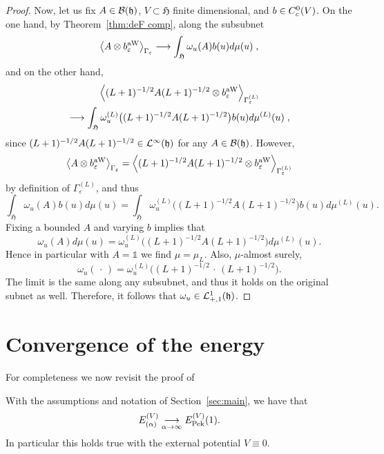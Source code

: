 \documentclass[AHL,Unicode,longabstracts,published]{cedram}
\DeclareMathOperator{\Pek}{Pek}
\DeclareMathOperator{\aww}{aW}
\newcommand{\cL}{\mathcal{L}}
\newcommand{\gH}{\mathfrak{H}}
\newcommand{\gh}{\mathfrak{h}}
\newcommand{\cB}{\mathcal{B}}
\newcommand{\1}{\mathds{1}}
\let\oldin\in
\renewcommand{\in}{\mathchoice{\oldin}{\oldin}{\,\oldin\,}{\,\oldin\,}}
\renewcommand*{\to}{\mathchoice{\longrightarrow}{\rightarrow}{\rightarrow}{\rightarrow}}
\let\originalleft\left
\let\originalright\right
\renewcommand{\left}{\mathopen{}\mathclose\bgroup\originalleft}
\renewcommand{\right}{\aftergroup\egroup\originalright}
\begin{document}
\begin{proof}
Now, let us fix $A\in \cB(\gh)$, $V\subset  \gH$ finite dimensional, and $b\in C^0_c(V)$. On the one hand, by Theorem~\ref{thm:deF comp}, along the subsubnet
\begin{equation*}
\left\langle A\otimes b^{\aww}_{\varepsilon} \right\rangle_{\Gamma_\varepsilon}\to \int_{  \gH}^{}\omega_u(A)b(u) d\mu(u)\;,
\end{equation*}
and on the other hand,
\begin{multline*}
\left\langle (L+1)^{-1/2}A(L+1)^{-1/2}\otimes b^{\aww}_{\varepsilon} \right\rangle_{\Gamma^{(L)}_\varepsilon}\\
\to \int_{\gH}^{}\omega_u^{(L)}\bigl((L+1)^{-1/2}A(L+1)^{-1/2}\bigr)b(u) d\mu^{(L)}(u)\;,
\end{multline*}
since $(L+1)^{-1/2}A(L+1)^{-1/2}\in \cL^{\infty}(\gh)$ for any $A\in
\cB(\gh)$. However,
\begin{equation*}
\left\langle A\otimes b^{\aww}_{\varepsilon} \right\rangle_{\Gamma_\varepsilon}=\left\langle (L+1)^{-1/2}A(L+1)^{-1/2}\otimes b^{\aww}_{\varepsilon} \right\rangle_{\Gamma^{(L)}_\varepsilon}
\end{equation*}
by definition of $\Gamma_{\varepsilon}^{(L)}$, and thus
\begin{equation*}
\int_{  \gH}^{}\omega_u(A)b(u) d\mu(u)=\int_{  \gH}^{}\omega_u^{(L)}\bigl((L+1)^{-1/2}A(L+1)^{-1/2}\bigr)b(u) d\mu^{(L)}(u).
\end{equation*}
Fixing a bounded $A$ and varying $b$ implies that
\[
\omega_u(A) d\mu(u) = \omega_u^{(L)}\bigl((L+1)^{-1/2}A(L+1)^{-1/2}\bigr)d\mu^{(L)}(u).
\]
Hence in particular with $A= \1$ we find $\mu= \mu_L$. Also, $\mu$-almost surely,
\begin{equation*}
\omega_u(\,\cdot\,)=\omega^{(L)}_u\bigl((L+1)^{-1/2}\,\cdot \,(L+1)^{-1/2}\bigr).
\end{equation*}
The limit is the same along any subsubnet, and thus it holds on the original subnet as well. Therefore, it follows that $\omega_u\in \cL^1_{+,1}(\gh)$.
\end{proof}

\section{Convergence of the energy}\label{sec:energy}

For completeness we now revisit the proof of

\begin{theo}\label{thm:ener}
With the assumptions and notation of Section~\ref{sec:main}, we have that
\begin{equation*}
E_{(\alpha)} ^{(V)} \underset{\alpha \to \infty}{\to} E^{(V)}_{\Pek}(1).
\end{equation*}
In particular this holds true with the external potential $V\equiv 0$.
\end{theo}
\end{document}
